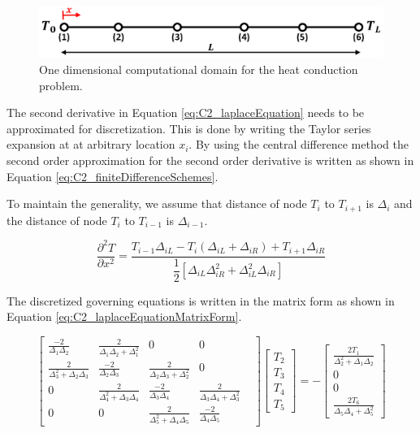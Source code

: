\begin{figure}[h]
	\centering
	\includegraphics[width=14.00cm]{Chapter_2/figure/benchmark_case_computational_domain.png}
	\caption{One dimensional computational domain for the heat conduction problem.}
	\label{fig:C2_discretizedDomain}
\end{figure}

The second derivative in Equation \eqref{eq:C2_laplaceEquation} needs to be approximated for discretization. This is done by writing the Taylor series expansion at at arbitrary location $x_i$. By using the central difference method the second order approximation for the second order derivative is written as shown in Equation \eqref{eq:C2_finiteDifferenceSchemes}.

To maintain the generality, we assume that distance of node $T_i$ to $T_{i+1}$ is $\Delta_i$ and the distance of node $T_i$ to $T_{i-1}$ is $\Delta_{i-1}$.

\begin{equation}\label{eq:C2_finiteDifferenceSchemes}
	\frac{\partial^2 T}{\partial x^2} = 
	\frac{T_{i-1} \Delta_{iL} - 
	      T_{i} (\Delta_{iL} + \Delta_{iR}) + 
	      T_{i+1} \Delta_{iR}}
	     {\dfrac{1}{2} \left[ \Delta_{iL} \Delta_{iR}^2 + 
	                         \Delta_{iL}^2 \Delta_{iR} \right]}
\end{equation}

The discretized governing equations is written in the matrix form as shown in Equation \eqref{eq:C2_laplaceEquationMatrixForm}.

\begin{equation}\label{eq:C2_laplaceEquationMatrixForm}
	\begin{bmatrix}
		\frac{-2}{\Delta_{1} \Delta_{2}} &
		\frac{2}{\Delta_{1} \Delta_{2} + \Delta_{1}^2} &
		0 &
		0 &
		\\
		\frac{2}{\Delta_{3}^2 + \Delta_{2} \Delta_{3}} & 
		\frac{-2}{\Delta_{2} \Delta_{3}} &
		\frac{2}{\Delta_{2} \Delta_{3} + \Delta_{2}^2} &
		0
		\\
		0 &
		\frac{2}{\Delta_{4}^2 + \Delta_{3} \Delta_{4}} & 
		\frac{-2}{\Delta_{3} \Delta_{4}} &
		\frac{2}{\Delta_{3} \Delta_{4} + \Delta_{3}^2} &
		\\
		0 &
		0 &
		\frac{2}{\Delta_{5}^2 + \Delta_{4} \Delta_{5}} & 
		\frac{-2}{\Delta_{4} \Delta_{5}}
	\end{bmatrix}
	\begin{bmatrix}
		T_2 \\
		T_3 \\
		T_4 \\
		T_5
	\end{bmatrix}
	=
	-\begin{bmatrix}
	 	\frac{2T_1}{\Delta_{2}^2 + \Delta_{1} \Delta_{2}} \\
 		0 \\
		0 \\
		\frac{2T_6}{\Delta_{5} \Delta_{4} + \Delta_{5}^2}
	\end{bmatrix}
\end{equation}

